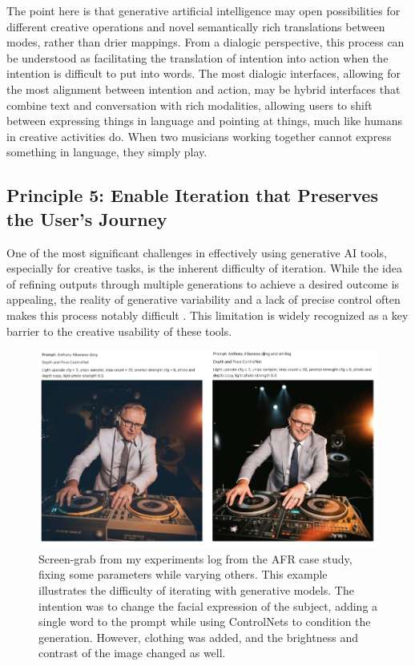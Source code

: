 The point here is that generative artificial intelligence may open possibilities for different creative operations and novel semantically rich translations between modes, rather than drier mappings. From a dialogic perspective, this process can be understood as facilitating the translation of intention into action when the intention is difficult to put into words. The most dialogic interfaces, allowing for the most alignment between intention and action, may be hybrid interfaces that combine text and conversation with rich modalities, allowing users to shift between expressing things in language and pointing at things, much like humans in creative activities do. When two musicians working together cannot express something in language, they simply play.

\subsection{Principle 5: Enable Iteration that Preserves the User's Journey}

One of the most significant challenges in effectively using generative AI tools, especially for creative tasks, is the inherent difficulty of iteration. While the idea of refining outputs through multiple generations to achieve a desired outcome is appealing, the reality of generative variability and a lack of precise control often makes this process notably difficult \cite{Park2024-gw}. This limitation is widely recognized as a key barrier to the creative usability of these tools.

\begin{figure}[H]
    \centering
    \includegraphics[width=1\linewidth]{alboexperiments.png}
    \caption{Screen-grab from my experiments log from the AFR case study, fixing some parameters while varying others. This example illustrates the difficulty of iterating with generative models. The intention was to change the facial expression of the subject, adding a single word to the prompt while using ControlNets to condition the generation. However, clothing was added, and the brightness and contrast of the image changed as well.}
    \label{fig:albo_series}
\end{figure}


